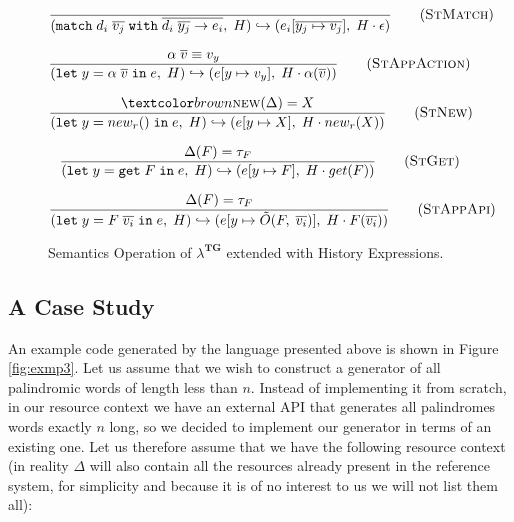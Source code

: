 \begin{figure}[H]
    \begin{equation}
        \frac{
            \space
        }{
            (\texttt{match}\;d_i\;\overline{v_j}\;\texttt{with}\;\overline{d_i\;\overline{y_j} \rightarrow e_i}, \; H) \hookrightarrow (e_i[\overline{y_j \mapsto v_j}], \;H \cdot \epsilon)
        }
        \tag{\textsc{StMatch}}
        \label{eq:stmatch}
    \end{equation}

    \begin{equation}
        \frac{
            \alpha \; \overline{v} \equiv v_y
        }{
            (\texttt{let}\;y = \alpha\;\overline{v}\;\texttt{in}\;e, \; H) \hookrightarrow (e[y \mapsto v_y], \; H \cdot \alpha(\overline{v}))
        }
        \tag{\textsc{StAppAction}}
        \label{eq:stappaction}
    \end{equation}

    \begin{equation}
        \frac{
            \nextd(\Delta) = X
        }{
            (\texttt{let}\;y = new_r ()\;\texttt{in}\;e, \; H) \hookrightarrow (e[y \mapsto X], \; H \cdot new_r(X))
        }
        \tag{\textsc{StNew}}
        \label{eq:stnew}
    \end{equation}

    \begin{equation}
        \frac{
            \Delta(F) = \tau_F
        }{
            (\texttt{let}\;y = \texttt{get}\;F\;\texttt{in}\;e, \; H) \hookrightarrow (e[y \mapsto F], \; H \cdot get(F))
        }
        \tag{\textsc{StGet}}
        \label{eq:stget}
    \end{equation}

    \begin{equation}
        \frac{
            \Delta(F) = \tau_F
        }{
            (\texttt{let}\;y = F\;\overline{v_i}\;\texttt{in}\;e, \; H) \hookrightarrow (e[y \mapsto \tilde{O}(F, \;\overline{v_i})], \; H \cdot F(\overline{v_i}))
        }
        \tag{\textsc{StAppApi}}
        \label{eq:stappapi}
    \end{equation}
    \caption{Semantics Operation of $\lambda^{\textbf{TG}}$ extended with History Expressions.}
    \label{fig:semantic-op}
\end{figure}

\subsection{A Case Study}

An example code generated by the language presented above is shown in Figure \ref{fig:exmp3}. Let us assume that we wish to construct a generator of all palindromic words of length less than $n$. Instead of implementing it from scratch, in our resource context we have an external API that generates all palindromes words exactly $n$ long, so we decided to implement our generator in terms of an existing one. Let us therefore assume that we have the following resource context (in reality $\Delta$ will also contain all the resources already present in the reference system, for simplicity and because it is of no interest to us we will not list them all):

